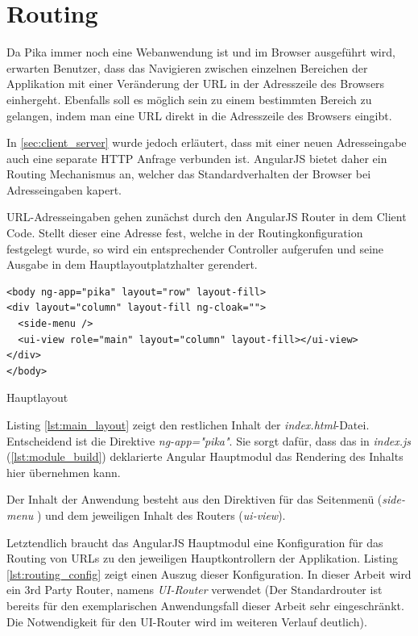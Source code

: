\section{Routing}
\label{sec:routing}

Da Pika immer noch eine Webanwendung ist und im Browser ausgeführt wird, erwarten Benutzer, dass das Navigieren zwischen einzelnen Bereichen der Applikation mit einer Veränderung der URL in der Adresszeile des Browsers einhergeht. Ebenfalls soll es möglich sein zu einem bestimmten Bereich zu gelangen, indem man eine URL direkt in die Adresszeile des Browsers eingibt.

In \ref{sec:client_server} wurde jedoch erläutert, dass mit einer neuen Adresseingabe auch eine separate HTTP Anfrage verbunden ist. AngularJS bietet daher ein Routing Mechanismus an, welcher das Standardverhalten der Browser bei Adresseingaben kapert.

URL-Adresseingaben gehen zunächst durch den AngularJS Router in dem Client Code. Stellt dieser eine Adresse fest, welche in der Routingkonfiguration festgelegt wurde, so wird ein entsprechender Controller aufgerufen und seine Ausgabe in dem Hauptlayoutplatzhalter gerendert.


\begin{listing}[H]
\begin{verbatim}
<body ng-app="pika" layout="row" layout-fill>
<div layout="column" layout-fill ng-cloak="">
  <side-menu />
  <ui-view role="main" layout="column" layout-fill></ui-view>
</div>
</body>
\end{verbatim}
\caption{Hauptlayout}
\label{lst:main_layout}
\end{listing}

Listing \ref{lst:main_layout} zeigt den restlichen Inhalt der \textit{index.html}-Datei. Entscheidend ist die Direktive \textit{ng-app="pika"}. Sie sorgt dafür, dass das in \textit{index.js} (\ref{lst:module_build}) deklarierte Angular Hauptmodul das Rendering des Inhalts hier übernehmen kann.

Der Inhalt der Anwendung besteht aus den Direktiven für das Seitenmenü (\textit{side-menu} ) und dem jeweiligen Inhalt des Routers (\textit{ui-view}).

Letztendlich braucht das AngularJS Hauptmodul eine Konfiguration für das Routing von URLs zu den jeweiligen Hauptkontrollern der Applikation. Listing \ref{lst:routing_config} zeigt einen Auszug dieser Konfiguration. In dieser Arbeit wird ein 3rd Party Router, namens \textit{UI-Router} verwendet (Der Standardrouter ist bereits für den exemplarischen Anwendungsfall dieser Arbeit sehr eingeschränkt. Die Notwendigkeit für den UI-Router wird im weiteren Verlauf deutlich).

